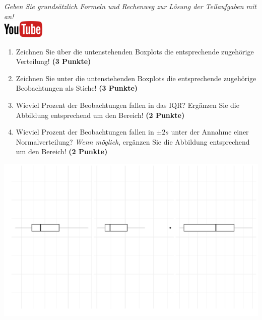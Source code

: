 \documentclass[a4paper, 9pt]{scrartcl}\usepackage[]{graphicx}\usepackage[]{xcolor}
\makeatletter
\def\maxwidth{ %
  \ifdim\Gin@nat@width>\linewidth
    \linewidth
  \else
    \Gin@nat@width
  \fi
}
\makeatother
\begin{document}
\textit{Geben Sie grunds{\"a}tzlich Formeln und Rechenweg zur L{\"o}sung der
  Teilaufgaben mit an!} \\[1Ex]

\hfill\href{https://youtu.be/Op-gjzASH9I}{\includegraphics[width =
  2cm]{img/youtube}}\\[1Ex]



\begin{enumerate}
\item Zeichnen Sie {\"u}ber die untenstehenden Boxplots die entsprechende
  zugeh{\"o}rige Verteilung! \textbf{(3 Punkte)} 
\item Zeichnen Sie unter die untenstehenden Boxplots die entsprechende
  zugeh{\"o}rige Beobachtungen als Stiche! \textbf{(3 Punkte)}
\item Wieviel Prozent der Beobachtungen fallen in das IQR? Erg{\"a}nzen Sie die
  Abbildung entsprechend um den Bereich! \textbf{(2 Punkte)}
\item Wieviel Prozent der Beobachtungen fallen in $\pm 2s$ unter
  der Annahme einer Normalverteilung?  \textit{Wenn m{\"o}glich}, erg{\"a}nzen Sie
  die Abbildung entsprechend um den Bereich! \textbf{(2 Punkte)}
\end{enumerate}




{\centering \includegraphics[width=\maxwidth]{img/desc-stat-11-1} 

}
\end{document}
